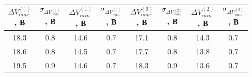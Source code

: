 \begin{tabular}{cccccccc}
\toprule
$\Delta V_{max}^{(1)}$, В & $\sigma_{\Delta V_{max}^{(1)}}$, В & $\Delta V_{min}^{(1)}$, В & $\sigma_{\Delta V_{min}^{(1)}}$, В & $\Delta V_{max}^{(2)}$, В & $\sigma_{\Delta V_{max}^{(2)}}$, В & $\Delta V_{min}^{(2)}$, В & $\sigma_{\Delta V_{min}^{(2)}}$, В \\
\midrule
18.3 & 0.8 & 14.6 & 0.7 & 17.1 & 0.8 & 14.3 & 0.7 \\
18.6 & 0.8 & 14.5 & 0.7 & 17.7 & 0.8 & 13.8 & 0.7 \\
19.5 & 0.9 & 14.6 & 0.7 & 18.3 & 0.9 & 13.6 & 0.7 \\
\bottomrule
\end{tabular}
